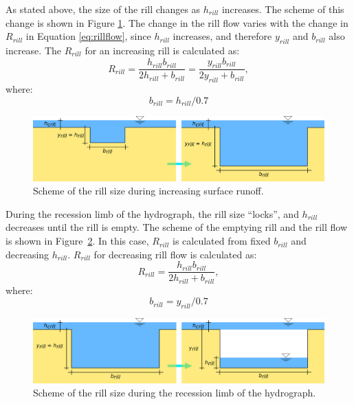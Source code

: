     As stated above, the size of the rill changes as $h_{rill}$ increases. The
    scheme of this change is shown in Figure \ref{fig:rill_plneni}. The change in
    the rill flow varies with the change in $R_{rill}$ in Equation
    \ref{eq:rillflow}, since $h_{rill}$ increases, and therefore $y_{rill}$ and
    $b_{rill}$ also increase. The $R_{rill}$ for an increasing rill is calculated
    as:
    \begin{equation}
        R_{rill} = \frac{h_{rill}b_{rill}}{2h_{rill}+b_{rill}}  =
        \frac{y_{rill}b_{rill}}{2y_{rill}+b_{rill}},
      \label{eq:rrill}
    \end{equation}
    where:
    \begin{equation}
      b_{rill} = h_{rill}/0.7
      \label{eq:brill}
    \end{equation}


    \begin{figure}[b]
        \centering
        \includegraphics[width=1\linewidth]{./img/rill_schema_plneni.png}
        \caption{Scheme of the rill size during increasing surface runoff.}
        \label{fig:rill_plneni}
    \end{figure}


    During the recession limb of the hydrograph, the rill size “locks”, and
    $h_{rill}$ decreases until the rill is empty. The scheme of the emptying rill
    and the rill flow is shown in Figure~\ref{fig:rill_prazdneni}. In this case,
    $R_{rill}$ is calculated from fixed $b_{rill}$ and decreasing $h_{rill}$.
    $R_{rill}$ for decreasing rill flow is calculated as:
    \begin{equation}
        R_{rill} = \frac{h_{rill}b_{rill}}{2h_{rill}+b_{rill}},
      \label{eq:rrill2}
    \end{equation}
    where:
    \begin{equation}
      b_{rill} = y_{rill}/0.7
      \label{eq:brill2}
    \end{equation}

    \begin{figure}[t]
        \includegraphics[width=1\linewidth]{./img/rill_schema_prazdneni.png}
        \caption{Scheme of the rill size during the recession limb of the hydrograph.}
        \label{fig:rill_prazdneni}
    \end{figure}

